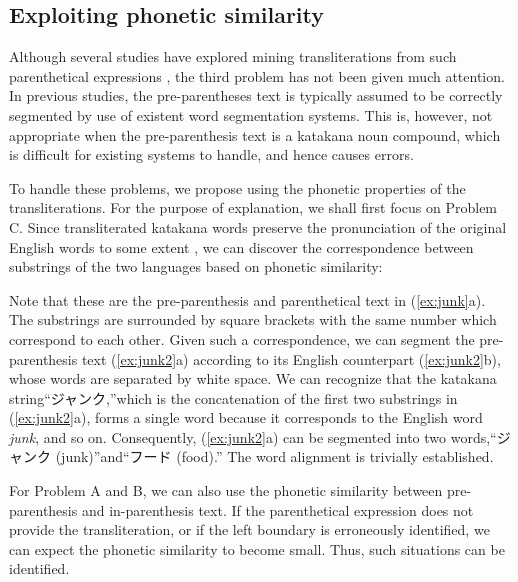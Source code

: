 \documentclass[english]{jnlp_1.4_rep}
\begin{document}
\subsection{Exploiting phonetic similarity}

Although several studies have explored mining transliterations from such
parenthetical expressions \cite{Cao07,Wu09}, the third problem has not
been given much attention. In previous studies, the pre-parentheses text
is typically assumed to be correctly segmented by use of existent word
segmentation systems. This is, however, not appropriate when the
pre-parenthesis text is a katakana noun compound, which is difficult
for existing systems to handle, and hence causes errors.

To handle these problems, we propose using the phonetic properties of
the transliterations. For the purpose of explanation, we shall first
focus on Problem C. Since transliterated katakana words preserve the
pronunciation of the original English words to some extent
\cite{Knight98}, we can discover the correspondence between substrings
of the two languages based on phonetic similarity:

\begin{lingexample}
\end{lingexample} 

\noindent
Note that these are the pre-parenthesis and parenthetical text in
(\ref{ex:junk}a). The substrings are surrounded by square brackets with
the same number which correspond to each other. Given such a correspondence, we
can segment the pre-parenthesis text (\ref{ex:junk2}a) according to its
English counterpart (\ref{ex:junk2}b), whose words are separated by
white space. We can recognize that the katakana string“ジャンク,”which is the concatenation of the first two substrings in
(\ref{ex:junk2}a), forms a single word because it corresponds to the
English word {\it junk}, and so on. Consequently, (\ref{ex:junk2}a) can
be segmented into two words,“ジャンク (junk)”and“フード (food).”
The word alignment is trivially established.

For Problem A and B, we can also use the phonetic similarity between
pre-parenthesis and in-parenthesis text. If the parenthetical expression
does not provide the transliteration, or if the left boundary is
erroneously identified, we can expect the phonetic similarity to become
small. Thus, such situations can be identified.
\end{document}
